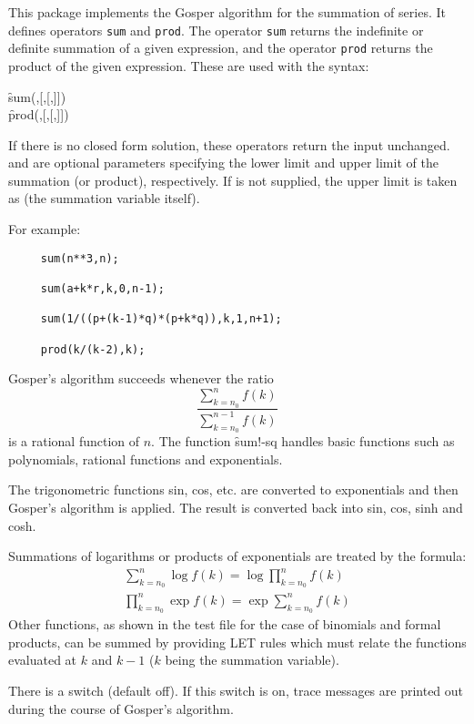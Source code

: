 
  
This package implements the Gosper algorithm for the summation of series.
It defines operators \texttt{sum} and \texttt{prod}.  The operator \texttt{sum} returns the indefinite
or definite summation of a given expression, and the operator \texttt{prod} returns
the product of the given expression.  These are used with the syntax:

\hypertarget{operator:SUM}{}
\hypertarget{operator:PROD}{}
\begin{syntaxtable}
  \f{sum}(,[,[,]]) \\[\baselineskip]
  \f{prod}(,[,[,]]) \\
\end{syntaxtable}
If there is no closed form solution, these operators return the input
unchanged.   and  are optional parameters specifying the lower
limit and upper limit of the summation (or product), respectively.  If 
is not supplied, the upper limit is taken as  (the summation variable
itself).

For example:

\begin{verbatim}
     sum(n**3,n);

     sum(a+k*r,k,0,n-1);

     sum(1/((p+(k-1)*q)*(p+k*q)),k,1,n+1);

     prod(k/(k-2),k);
\end{verbatim}

Gosper's algorithm succeeds whenever the ratio
\[ \frac{\sum_{k=n_0}^n f(k)}{\sum_{k=n_0}^{n-1} f(k)} \]
is a rational function of $n$.  The function \f{sum!-sq}
handles basic functions such as polynomials, rational functions and
exponentials. 

The trigonometric functions sin, cos, etc. are converted to exponentials
and then Gosper's algorithm is applied.  The result is converted back into
sin, cos, sinh and cosh.

Summations of logarithms or products of exponentials are treated by the
formula:
\begin{gather*}
  \sum_{k=n_0}^{n} \log f(k) = \log \prod_{k=n_0}^n f(k) \\
  \prod_{k=n_0}^n \exp f(k) = \exp \sum_{k=n_0}^n f(k)
\end{gather*}
Other functions, as shown in the test file for the case of binomials and
formal products, can be summed by providing LET rules which must relate the
functions evaluated at $k$ and $k - 1$ ($k$ being the summation variable).

 
\hypertarget{switch:TRSUM}{}
There is a switch  (default off).  If this switch is on, trace
messages are printed out during the course of Gosper's algorithm.

